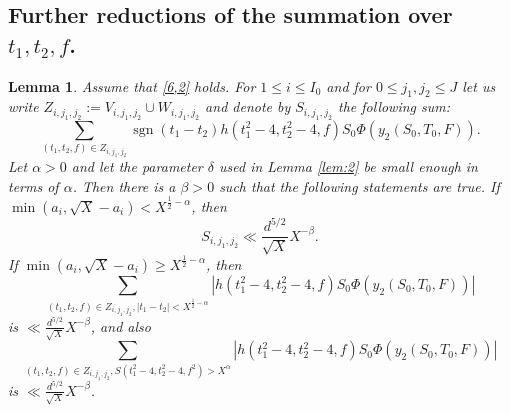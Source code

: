 \documentclass[12pt]{amsart}
\newtheorem{lemma}[theorem]{Lemma}
\theoremstyle{definition}
\numberwithin{equation}{section}
\begin{document}
\subsection{Further reductions of the summation over $t_1,t_2,f$.}


\begin{lemma}\label{lem:3}Assume that \eqref{6,2} holds. For $1\le
i\le I_0$ and for
$0\le j_1,j_2\le J$ let us write $Z_{i,j_1,j_2}:=V_{i,j_1,j_2}\cup
W_{i,j_1,j_2}$ and denote by $S_{i,j_1,j_2}$ the following sum:
\[\sum_{\left(t_1,t_2,f\right)\in Z_{i,j_1,j_2}}\operatorname{sgn}
(t_1-t_2)h\left(t_1^2-4,t_2^2-4,f\right)S_0\Phi\left(y_2\left(S_0
,T_0,F\right)\right).\]
Let $\alpha >0$ and let the parameter $\delta$ used in Lemma \ref{lem:2} be small enough in terms of $\alpha$. Then there is a $\beta >0$ such that the following
statements are true.
If $\min\left(a_i,\sqrt {X}-a_i\right)<X^{\frac 12-\alpha}$, then
\begin{equation}S_{i,j_1,j_2}\ll\frac {d^{5/2}}{\sqrt {X}}X^{-\beta}
.\label{14}\end{equation}
If $\min\left(a_i,\sqrt {X}-a_i\right)\ge X^{\frac 12-\alpha}$, then
\begin{equation}\sum_{\left(t_1,t_2,f\right)\in Z_{i,j_1,j_2},\left
|t_1-t_2\right|<X^{\frac 12-\alpha}}\left|h\left(t_1^2-4,t_2^2-4,
f\right)S_0\Phi\left(y_2\left(S_0,T_0,F\right)\right)\right|\label{15}\end{equation}
is $\ll\frac {d^{5/2}}{\sqrt {X}}X^{-\beta}$, and also
\begin{equation}\sum_{\left(t_1,t_2,f\right)\in Z_{i,j_1,j_2},S\left
(t_1^2-4,t_2^2-4,f^2\right)>X^{\alpha}}\left|h\left(t_1^2-4,t_2^2
-4,f\right)S_0\Phi\left(y_2\left(S_0,T_0,F\right)\right)\right|\label{16}\end{equation}
is $\ll\frac {d^{5/2}}{\sqrt {X}}X^{-\beta}$.
\end{lemma}
\end{document}
